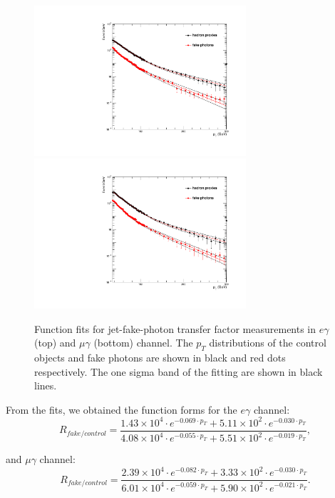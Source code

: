 \documentclass[thesis.tex]{subfiles}
\renewcommand\_{\textunderscore\allowbreak}
\begin{document}
\begin{figure}[hbtp]
  \centering
    \includegraphics[width=0.7\textwidth]{Figures/JetFakeRate_transfer_eg_EB.pdf} \\
    \includegraphics[width=0.7\textwidth]{Figures/JetFakeRate_transfer_mg_EB.pdf}
  \caption{Function fits for jet-fake-photon transfer factor measurements in $e\gamma$ (top) and $\mu\gamma$ (bottom) channel. The $p_T$ distributions of the control objects and fake photons are shown in black and red dots respectively. The one sigma band of the fitting are shown in black lines.}
    \label{fig:jetFakePt}
\end{figure}

From the fits, we obtained the function forms for the $e\gamma$ channel:
\begin{equation}
R_{fake/control} = \frac{ 1.43 \times 10^4 \cdot e^{-0.069 \cdot p_T} + 5.11 \times 10^2 \cdot e^{-0.030 \cdot p_T}}{4.08 \times 10^4 \cdot e^{-0.055 \cdot p_T} +  5.51 \times 10^2 \cdot e^{-0.019 \cdot p_T}},
\end{equation}

and $\mu\gamma$ channel:
\begin{equation}
R_{fake/control} = \frac{ 2.39 \times 10^4 \cdot e^{-0.082 \cdot p_T} + 3.33 \times 10^2 \cdot e^{-0.030 \cdot p_T}}{6.01 \times 10^4 \cdot e^{-0.059 \cdot p_T} +  5.90 \times 10^2 \cdot e^{-0.021 \cdot p_T}}.
\end{equation}
\end{document}
